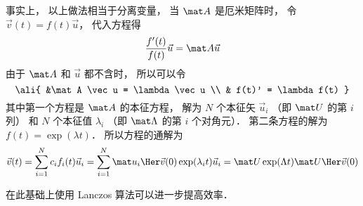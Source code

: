 事实上， 以上做法相当于分离变量， 当 $\mat A$ 是厄米矩阵时， 令 $\vec v(t) = f(t)\vec u$， 代入方程得 
\begin{equation}
\frac{f'(t)}{f(t)} \vec u = \mat A \vec u
\end{equation}
由于 $\mat A$ 和 $\vec u$ 都不含时， 所以可以令
\begin{equation}\ali{
&\mat A \vec u = \lambda \vec u \\
& f(t)' = \lambda f(t)
}\end{equation}
其中第一个方程是 $\mat A$ 的本征方程， 解为 $N$ 个本征矢 $\vec u_i$ （即 $\mat U$ 的第 $i$ 列） 和 $N$ 个本征值 $\lambda_i$ （即 $\mat \Lambda$ 的第 $i$ 个对角元）． 第二条方程的解为 $f(t) = \exp(\lambda t)$． 所以方程的通解为
\begin{equation}
\vec v(t) = \sum_{i = 1}^N c_i f_i(t) \vec u_i = \sum_{i = 1}^N \mat u_i\Her  \vec v(0) \exp(\lambda_i t) \vec u_i = \mat U \exp(\Lambda t) \mat U\Her \vec v(0)
\end{equation}

在此基础上使用 Lanczos 算法可以进一步提高效率．
